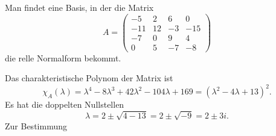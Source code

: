 Man findet eine Basis, in der die Matrix
\[
A=\begin{pmatrix}
 -5&  2&  6&   0\\
-11& 12& -3& -15\\
 -7&  0&  9&   4\\
  0&  5& -7&  -8
\end{pmatrix}
\]
die relle Normalform bekommt.

\begin{loesung}
Das charakteristische Polynom der Matrix ist 
\[
\chi_{A}(\lambda)
=
\lambda^4-8\lambda^3+42\lambda^2-104\lambda+169
=
(\lambda^2-4\lambda+13)^2.
\]
Es hat die doppelten Nullstellen
\[
\lambda
=
2\pm \sqrt{4-13}
=
2\pm \sqrt{-9}
=
2\pm 3i.
\]
Zur Bestimmung
\end{loesung}

